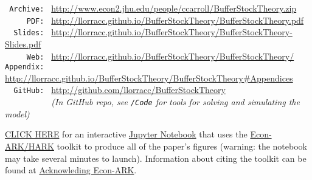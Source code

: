 \documentclass[BufferStockTheory]{subfiles}
\begin{document}
\hypertarget{links}{}
\begin{small}
  \parbox{\textwidth}{
    \begin{center}
      \begin{tabbing}
        \texttt{~Archive:~} \= \= \url{http://www.econ2.jhu.edu/people/ccarroll/BufferStockTheory.zip} \\  %
        \texttt{~~~~~PDF:~} \> \> \url{http://llorracc.github.io/BufferStockTheory/BufferStockTheory.pdf} \\
        \texttt{~~Slides:~} \> \> \url{http://llorracc.github.io/BufferStockTheory/BufferStockTheory-Slides.pdf} \\
        \texttt{~~~~~Web:~} \> \> \url{http://llorracc.github.io/BufferStockTheory/BufferStockTheory/}    \\
        \texttt{Appendix:~} \> \> \url{http://llorracc.github.io/BufferStockTheory/BufferStockTheory\#Appendices}    \\
        \texttt{~~GitHub:~} \> \> \url{http://github.com/llorracc/BufferStockTheory} \\
        \texttt{~~~~~~~~~~} \> \> \textit{(In GitHub repo, see \texttt{/Code} for tools for solving and simulating the model)} \\
      \end{tabbing}
    \end{center}
    
    \href{https://econ-ark.org/materials/BufferStockTheory}{CLICK HERE} for an interactive \href{https://en.wikipedia.org/wiki/Project\_Jupyter\#Jupyter_Notebook}{Jupyter Notebook} that uses the \href{https://econ-ark/HARK}{Econ-ARK/HARK} toolkit to produce all of the paper's figures (warning: the notebook may take several minutes to launch).  Information about citing the toolkit can be found at \href{https://econ-ark.org/acknowledging/}{Acknowleding Econ-ARK}.
  } %
\end{small}

\begin{authorsinfo}
\end{authorsinfo}
\end{document}
